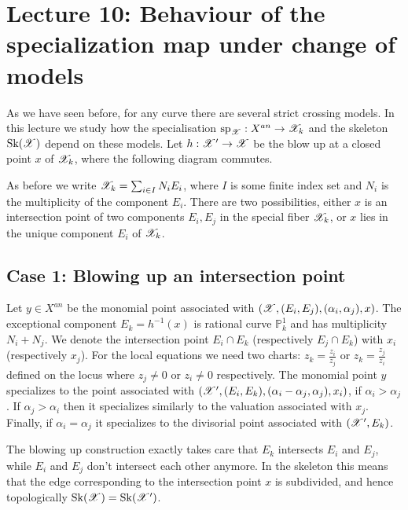 \section{Lecture 10: Behaviour of the specialization map under change of models}
As we have seen before, for any curve there are several strict crossing models. In this lecture we study how the specialisation  $\operatorname{sp}_{\mathcal{X}}:X^{an}\to\mathcal{X}_k$ and the skeleton $\operatorname{Sk}(\mathcal{X})$ depend on these models. Let $h:\mathcal{X}'\to\mathcal{X}$ be the blow up at a closed point $x$ of $\mathcal{X}_k$, where the following diagram commutes. 

\hspace{5cm}

As before we write $\mathcal{X}_k=\sum_{i\in I} N_iE_i$, where $I$ is some finite index set and $N_i$ is the multiplicity of the component $E_i$. There are two possibilities, either $x$ is an intersection point of two components $E_i,E_j$ in the special fiber $\mathcal{X}_k$, or $x$ lies in the unique component $E_i$ of $\mathcal{X}_k$. 

\subsection*{Case 1: Blowing up an intersection point} Let $y\in X^{an}$ be the monomial point associated with $(\mathcal{X},(E_i,E_j),(\alpha_i,\alpha_j),x)$. The exceptional component $E_k=h^{-1}(x)$ is rational curve $\mathbb P^1_k$ and has multiplicity $N_i+N_j$. We denote the intersection point $E_i\cap E_k$ (respectively $E_j\cap E_k$) with $x_i$ (respectively $x_j$). For the local equations we need two charts: $z_k=\frac{z_i}{z_j}$ or $z_k=\frac{z_j}{z_i}$ defined on the locus where $z_j\not=0$ or $z_i\not=0$ respectively. The monomial point $y$ specializes to the point associated with $(\mathcal{X}',(E_i,E_k),(\alpha_i-\alpha_j,\alpha_j),x_i)$, if $\alpha_i>\alpha_j$. If $\alpha_j>\alpha_i$ then it specializes similarly to the valuation associated with $x_j$. Finally, if $\alpha_i=\alpha_j$ it specializes to the divisorial point associated with $(\mathcal{X}',E_k)$. 

The blowing up construction exactly takes care that $E_k$ intersects $E_i$ and $E_j$, while $E_i$ and $E_j$ don't intersect each other anymore. In the skeleton this means that the edge corresponding to the intersection point $x$ is subdivided, and hence topologically $\operatorname{Sk}(\mathcal{X})=\operatorname{Sk}(\mathcal{X}')$. 

